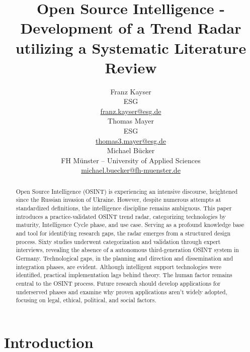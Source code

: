 \documentclass[10pt]{article}
\title{Open Source Intelligence - Development of a Trend Radar utilizing a Systematic Literature Review}
\author{Franz Kayser \\
  ESG \\
  {\underline{ franz.kayser@esg.de}} \\\And
  Thomas Mayer \\
  ESG  \\
  {\underline{ thomas3.mayer@esg.de} }\\\And 
  Michael Bücker \\
  FH Münster -- University of Applied Sciences\\
  {\underline{michael.buecker@fh-muenster.de}} \\}
\date{}
\begin{document}
\maketitle
\begin{abstract}
    Open Source Intelligence (OSINT) is experiencing an intensive discourse,
    heightened since the Russian invasion of Ukraine. However, despite numerous attempts
    at standardized definitions, the intelligence discipline remains ambiguous. This paper
    introduces a practice-validated OSINT trend radar, categorizing technologies by maturity,
    Intelligence Cycle phase, and use case. Serving as a profound knowledge base and tool for
    identifying research gaps, the radar emerges from a structured design process. Sixty
    studies underwent categorization and validation through expert interviews,
    revealing the absence of a autonomous third-generation OSINT
    system in Germany. Technological gaps, in the planning and direction and
    dissemination and integration phases, are evident. Although intelligent support
    technologies were identified, practical implementation lags behind theory. The human
    factor remains central to the OSINT process. Future research should develop
    applications for underserved phases and examine why proven applications aren't widely
    adopted, focusing on legal, ethical, political, and social factors.
\end{abstract}

\section{Introduction} \label{sec:introduction}
\end{document}
